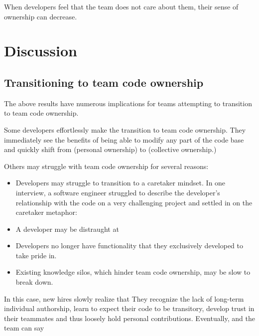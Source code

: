 When developers feel that the team does not care about them, their sense of ownership can decrease.

\section{Discussion}
\label{Discussion}
\subsection{Transitioning to team code ownership}
\label{Transitioning}

The above results have numerous implications for teams attempting to transition to team code ownership. 

Some developers effortlessly make the transition to team code ownership. They immediately see the benefits of being able to modify any part of the code base and quickly shift from  (personal ownership) to  (collective ownership.)

Others may struggle with team code ownership for several reasons:

\begin{itemize}  

\item Developers may struggle to transition to a caretaker mindset.  In one interview, a software engineer struggled to describe the developer's relationship with the code on a very challenging project and settled in on the caretaker metaphor:  

\item A developer may be distraught at  

\item Developers no longer have functionality that they exclusively developed to take pride in.

\item Existing knowledge silos, which hinder team code ownership, may be slow to break down.
 
\end{itemize}

In this case, new hires slowly realize that  They recognize the lack of long-term individual authorship, learn to expect their code to be transitory, develop trust in their teammates and thus loosely hold personal contributions.  Eventually,  and the team can say 

